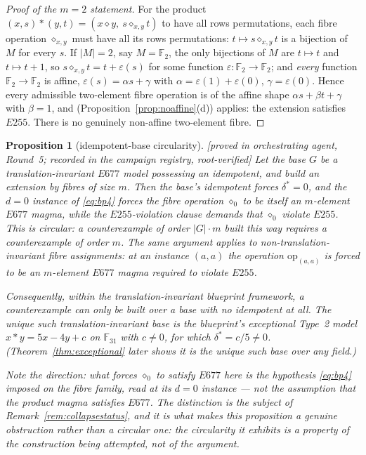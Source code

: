 \documentclass[11pt]{article}
\theoremstyle{plain}
\newtheorem{proposition}[theorem]{Proposition}
\theoremstyle{definition}
\theoremstyle{remark}
\numberwithin{equation}{section}
\newcommand{\F}{\mathbb{F}}
\newcommand{\op}{\mathbin{*}}
\newcommand{\statusbox}[1]{{\small\sloppy\textsf{[#1]}}}
\newcommand{\PROVED}[1]{\statusbox{proved in #1, root-verified}}
\begin{document}
\begin{proof}[Proof of the $m=2$ statement]
For the product $(x,s)\op(y,t) = (x\diamond y,\ s\diamond_{x,y}t)$ to have all rows
permutations, each fibre operation $\diamond_{x,y}$ must have all its rows permutations:
$t\mapsto s\diamond_{x,y}t$ is a bijection of $M$ for every $s$. If $|M| = 2$, say
$M = \F_2$, the only bijections of $M$ are $t\mapsto t$ and $t\mapsto t+1$, so
$s\diamond_{x,y}t = t + \varepsilon(s)$ for some function $\varepsilon:\F_2\to\F_2$; and
\emph{every} function $\F_2\to\F_2$ is affine, $\varepsilon(s) = \alpha s+\gamma$ with
$\alpha = \varepsilon(1)+\varepsilon(0)$, $\gamma = \varepsilon(0)$. Hence every admissible
two-element fibre operation is of the affine shape $\alpha s+\beta t+\gamma$ with
$\beta = 1$, and \cite[Lemma~13.4]{blueprint} (Proposition~\ref{prop:noaffine}(d)) applies:
the extension satisfies $E255$. There is no genuinely non-affine two-element fibre.
\end{proof}

\begin{proposition}[idempotent-base circularity]\label{prop:idempotentbase}
\PROVED{orchestrating agent, Round~5; recorded in the campaign registry}
Let the base $G$ be a translation-invariant $E677$ model possessing an idempotent, and build
an extension by fibres of size $m$. Then the base's idempotent forces $\delta^{*} = 0$, and
the $d=0$ instance of \eqref{eq:bp4} forces the fibre operation $\diamond_0$ to be \emph{itself} an
$m$-element $E677$ magma, while the $E255$-violation clause demands that $\diamond_0$ violate
$E255$. This is circular: a counterexample of order $|G|\cdot m$ built this way requires a
counterexample of order $m$. The same argument applies to non-translation-invariant fibre
assignments: at an instance $(a,a)$ the operation $\mathrm{op}_{(a,a)}$ is forced to be an
$m$-element $E677$ magma required to violate $E255$.

Consequently, within the translation-invariant blueprint framework, a counterexample can only
be built over a base with \emph{no} idempotent at all. The unique such translation-invariant
base is the blueprint's exceptional Type~2 model $x\op y = 5x-4y+c$ on $\F_{31}$ with $c\ne0$,
for which $\delta^{*} = c/5 \ne 0$. (Theorem~\ref{thm:exceptional} later shows it is the unique
such base over \emph{any} field.)

Note the direction: what forces $\diamond_0$ to satisfy $E677$ here is the \emph{hypothesis}
\eqref{eq:bp4} imposed on the fibre family, read at its $d = 0$ instance --- not the assumption
that the product magma satisfies $E677$. The distinction is the subject of
Remark~\ref{rem:collapsestatus}, and it is what makes this proposition a genuine obstruction
rather than a circular one: the circularity it exhibits is a property of the construction
being attempted, not of the argument.
\end{proposition}
\end{document}
